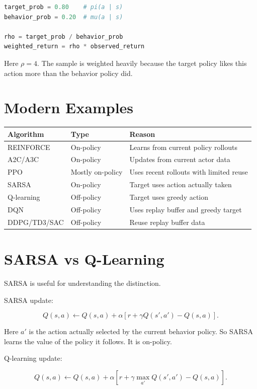 \documentclass[11pt]{article}
\begin{document}
\begin{lstlisting}[language=Python]
target_prob = 0.80    # pi(a | s)
behavior_prob = 0.20  # mu(a | s)

rho = target_prob / behavior_prob
weighted_return = rho * observed_return
\end{lstlisting}

Here $\rho = 4$.
The sample is weighted heavily because the target policy likes this action more than the behavior policy did.

\section{Modern Examples}

\begin{center}
\begin{tabular}{lll}
\toprule
Algorithm & Type & Reason \\
\midrule
REINFORCE & On-policy & Learns from current policy rollouts \\
A2C/A3C & On-policy & Updates from current actor data \\
PPO & Mostly on-policy & Uses recent rollouts with limited reuse \\
SARSA & On-policy & Target uses action actually taken \\
Q-learning & Off-policy & Target uses greedy action \\
DQN & Off-policy & Uses replay buffer and greedy target \\
DDPG/TD3/SAC & Off-policy & Reuse replay buffer data \\
\bottomrule
\end{tabular}
\end{center}

\section{SARSA vs Q-Learning}

SARSA is useful for understanding the distinction.

SARSA update:

\[
Q(s,a)
\leftarrow
Q(s,a)
+
\alpha
\left[
r + \gamma Q(s',a') - Q(s,a)
\right].
\]

Here $a'$ is the action actually selected by the current behavior policy.
So SARSA learns the value of the policy it follows.
It is on-policy.

Q-learning update:

\[
Q(s,a)
\leftarrow
Q(s,a)
+
\alpha
\left[
r + \gamma \max_{a'}Q(s',a') - Q(s,a)
\right].
\]
\end{document}
